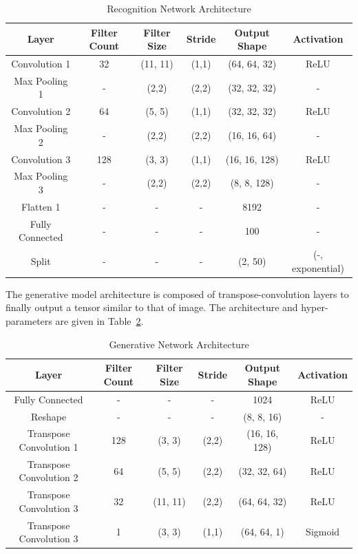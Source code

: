 \begin{table}
  \caption{Recognition Network Architecture}
\centering
\label{tab_encoder_paras}
\begin{tabular}{cccccc}
\hline
  Layer & Filter Count & Filter Size & Stride & Output Shape & Activation\\
\hline
  Convolution 1 & 32 & (11, 11) & (1,1) & (64, 64, 32) & ReLU \\
  Max Pooling 1 & - & (2,2) & (2,2) & (32, 32, 32) & -  \\
  Convolution 2 & 64 & (5, 5) & (1,1) & (32, 32, 32) & ReLU   \\
  Max Pooling 2 & - & (2,2) & (2,2) & (16, 16, 64) & - \\
  Convolution 3 & 128 & (3, 3) & (1,1) & (16, 16, 128) & ReLU   \\
  Max Pooling 3 & - & (2,2) & (2,2) & (8, 8, 128) & - \\
  Flatten 1 & - & - & - & 8192 & - \\
  Fully Connected & - & - & - & 100 & - \\
  Split & - & - & - & (2, 50) & (-, exponential) \\ \hline 
\end{tabular}
\end{table}



The generative model architecture is composed of transpose-convolution layers to finally output a tensor similar to that of image. The architecture and hyper-parameters are given in Table~\ref{tab_decoder_paras}.

\begin{table}
  \caption{Generative Network Architecture}
\centering
\label{tab_decoder_paras}
\begin{tabular}{cccccc}
\hline
  Layer & Filter Count & Filter Size & Stride & Output Shape & Activation\\
\hline
  Fully Connected & - & - & - & 1024 & ReLU \\
  Reshape & - & - & - & (8, 8, 16) & - \\
  Transpose Convolution 1 & 128 & (3, 3) & (2,2) & (16, 16, 128) & ReLU   \\
  Transpose Convolution 2 & 64 & (5, 5) & (2,2) & (32, 32, 64) & ReLU   \\
  Transpose Convolution 3 & 32 & (11, 11) & (2,2) & (64, 64, 32) & ReLU   \\
  Transpose Convolution 3 & 1 & (3, 3) & (1,1) & (64, 64, 1) & Sigmoid   \\
\hline
\end{tabular}
\end{table}

